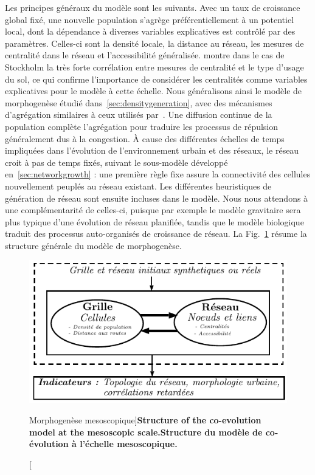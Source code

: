 {Les principes généraux du modèle sont les suivants. Avec un taux de croissance global fixé, une nouvelle population s'agrège préférentiellement à un potentiel local, dont la dépendance à diverses variables explicatives est contrôlé par des paramètres. Celles-ci sont la densité locale, la distance au réseau, les mesures de centralité dans le réseau et l'accessibilité généralisée. \cite{doi:10.1080/13658816.2014.893347} montre dans le cas de Stockholm la très forte corrélation entre mesures de centralité et le type d'usage du sol, ce qui confirme l'importance de considérer les centralités comme variables explicatives pour le modèle à cette échelle. Nous généralisons ainsi le modèle de morphogenèse étudié dans~\ref{sec:densitygeneration}, avec des mécanismes d'agrégation similaires à ceux utilisés par~\cite{raimbault2014hybrid}. Une diffusion continue de la population complète l'agrégation pour traduire les processus de répulsion généralement dus à la congestion. À cause des différentes échelles de temps impliquées dans l'évolution de l'environnement urbain et des réseaux, le réseau croit à pas de temps fixés, suivant le sous-modèle développé en~\ref{sec:networkgrowth} : une première règle fixe assure la connectivité des cellules nouvellement peuplés au réseau existant. Les différentes heuristiques de génération de réseau sont ensuite incluses dans le modèle. Nous nous attendons à une complémentarité de celles-ci, puisque par exemple le modèle gravitaire sera plus typique d'une évolution de réseau planifiée, tandis que le modèle biologique traduit des processus auto-organisés de croissance de réseau. La Fig.~\ref{fig:mesocoevolmodel:workflow} résume la structure générale du modèle de morphogenèse.
}




\begin{figure}
	\includegraphics[width=\linewidth]{Figures/MesoCoEvol/mesocoevol_fr.pdf}
	\caption[Morphogenesis at the mesoscopic scale][Morphogenèse mesoscopique]{\textbf{Structure of the co-evolution model at the mesoscopic scale.}\label{fig:mesocoevolmodel:workflow}}{\textbf{Structure du modèle de co-évolution à l'échelle mesoscopique.}\label{fig:mesocoevolmodel:workflow}}
\end{figure}



